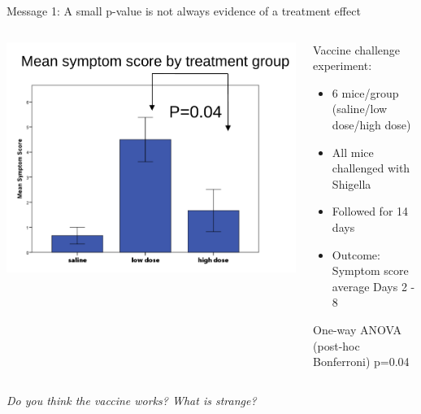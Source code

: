 \documentclass[10pt]{beamer}
\begin{document}
\begin{frame}{Message 1: A small p-value is not always evidence of a treatment effect}

  \begin{columns}
    \begin{column}{0.5\textwidth}
	\begin{center}
	\includegraphics[width=\textwidth]{Figures/message1}
	\end{center}
    \end{column}
    
    \begin{column}{0.5\textwidth}
    \begin{block}{Vaccine challenge experiment:}
      \begin{itemize} 
       \item 6 mice/group (saline/low dose/high dose)
       \item All mice challenged with Shigella
       \item Followed for 14 days
       \item  Outcome: Symptom score average Days 2 - 8
      \end{itemize}
      \end{block}
      
      \begin{alertblock}{}
       One-way ANOVA (post-hoc Bonferroni) p=0.04
      \end{alertblock}

    \end{column}
  \end{columns}
  
  \pause \vspace{0.3cm}
  \emph{\large Do you think the vaccine works? What is strange?}
  

\end{frame}
\end{document}
